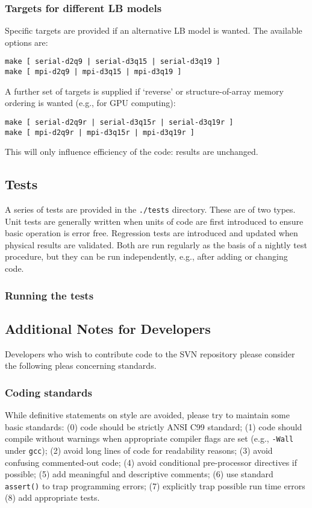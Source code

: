 \subsubsection{Targets for different LB models}

Specific targets are provided if an alternative LB model is wanted.
The available options are:
\begin{lstlisting}
make [ serial-d2q9 | serial-d3q15 | serial-d3q19 ]
make [ mpi-d2q9 | mpi-d3q15 | mpi-d3q19 ]
\end{lstlisting}
A further set of targets is supplied if `reverse' or structure-of-array
memory ordering is wanted (e.g., for GPU computing):
\begin{lstlisting}
make [ serial-d2q9r | serial-d3q15r | serial-d3q19r ]
make [ mpi-d2q9r | mpi-d3q15r | mpi-d3q19r ]
\end{lstlisting}
This will only influence efficiency of the code: results are unchanged.

\subsection{Tests}

A series of tests are provided in the \texttt{./tests} directory. These
are of two types. Unit tests are generally written when units of code
are first introduced to ensure basic operation is error free. Regression
tests are introduced and updated when physical results are validated.
Both are run regularly as the basis of a nightly test procedure, but
they can be run independently, e.g., after adding or changing code.

\subsubsection{Running the tests}

\subsection{Additional Notes for Developers}
\label{xref:developers}

Developers who wish to contribute code to the SVN repository
please consider the following pleas concerning standards.

\subsubsection{Coding standards}

While definitive statements on style are avoided, please try to
maintain some basic standards: (0) code should be strictly ANSI C99
standard; (1) code should compile without warnings when appropriate
compiler flags are set (e.g., \texttt{-Wall} under \texttt{gcc});
(2) avoid long lines of code for readability reasons;
(3) avoid confusing commented-out code; (4) avoid conditional pre-processor
directives if possible; (5) add meaningful and descriptive comments;
(6) use standard \texttt{assert()} to trap programming errors;
(7) explicitly trap possible run time errors (8) add appropriate
tests.

